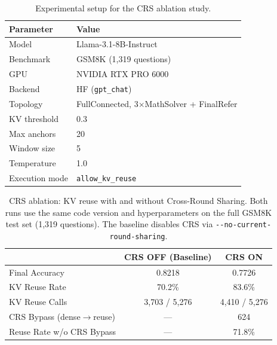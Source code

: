 \begin{table}[t]
\centering
\caption{Experimental setup for the CRS ablation study.}
\label{tab:crs-setup}
\renewcommand{\arraystretch}{1.15}
\begin{tabular}{|l|l|}
\hline
\textbf{Parameter}        & \textbf{Value} \\
\hline\hline
Model                     & Llama-3.1-8B-Instruct \\
\hline
Benchmark                 & GSM8K (1{,}319 questions) \\
\hline
GPU                       & NVIDIA RTX PRO 6000 \\
\hline
Backend                   & HF (\texttt{gpt\_chat}) \\
\hline
Topology                  & FullConnected, 3$\times$MathSolver + FinalRefer \\
\hline
KV threshold              & 0.3 \\
\hline
Max anchors               & 20 \\
\hline
Window size               & 5 \\
\hline
Temperature               & 1.0 \\
\hline
Execution mode            & \texttt{allow\_kv\_reuse} \\
\hline
\end{tabular}
\end{table}

\begin{table}[t]
\centering
\caption{CRS ablation: KV reuse with and without Cross-Round Sharing.
Both runs use the same code version and hyperparameters on the full
GSM8K test set (1{,}319 questions).  The baseline disables CRS via
\texttt{-{}-no-current-round-sharing}.}
\label{tab:crs-results}
\renewcommand{\arraystretch}{1.15}
\begin{tabular}{|l|c|c|}
\hline
                          & \textbf{CRS OFF (Baseline)} & \textbf{CRS ON} \\
\hline\hline
Final Accuracy            & 0.8218                      & 0.7726 \\
\hline
KV Reuse Rate             & 70.2\%                      & 83.6\% \\
\hline
KV Reuse Calls            & 3{,}703 / 5{,}276           & 4{,}410 / 5{,}276 \\
\hline
CRS Bypass (dense$\to$reuse) & ---                      & 624 \\
\hline
Reuse Rate w/o CRS Bypass & ---                         & 71.8\% \\
\hline
\end{tabular}
\end{table}


